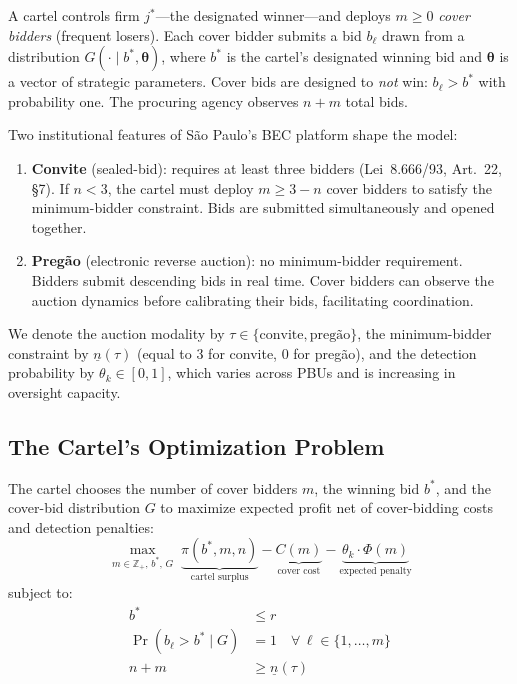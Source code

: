 A cartel controls firm $j^*$---the designated winner---and deploys
$m \geq 0$ \emph{cover bidders} (frequent losers). Each cover bidder
submits a bid $b_\ell$ drawn from a distribution $G(\cdot \mid b^*,
\boldsymbol{\theta})$, where $b^*$ is the cartel's designated winning
bid and $\boldsymbol{\theta}$ is a vector of strategic parameters. Cover
bids are designed to \emph{not} win: $b_\ell > b^*$ with probability
one. The procuring agency observes $n + m$ total bids.

Two institutional features of S\~ao Paulo's BEC platform shape the
model:

\begin{enumerate}
  \item \textbf{Convite} (sealed-bid): requires at least three bidders
    (Lei~8.666/93, Art.~22, \S7). If $n < 3$, the cartel must deploy
    $m \geq 3 - n$ cover bidders to satisfy the minimum-bidder
    constraint. Bids are submitted simultaneously and opened together.
  \item \textbf{Preg\~ao} (electronic reverse auction): no
    minimum-bidder requirement. Bidders submit descending bids in real
    time. Cover bidders can observe the auction dynamics before
    calibrating their bids, facilitating coordination.
\end{enumerate}

\noindent We denote the auction modality by $\tau \in \{\text{convite},
\text{preg\~ao}\}$, the minimum-bidder constraint by $\underline{n}(\tau)$
(equal to 3 for convite, 0 for preg\~ao), and the detection probability
by $\theta_k \in [0,1]$, which varies across PBUs and is increasing in
oversight capacity.


\subsection{The Cartel's Optimization Problem}
\label{sec:cartel_problem}

The cartel chooses the number of cover bidders $m$, the winning bid
$b^*$, and the cover-bid distribution $G$ to maximize expected profit
net of cover-bidding costs and detection penalties:
\begin{equation}
  \max_{m \in \mathbb{Z}_+,\, b^*,\, G} \; \underbrace{\pi(b^*, m, n)
  }_{\text{cartel surplus}}
  - \underbrace{C(m)}_{\text{cover cost}}
  - \underbrace{\theta_k \cdot \Phi(m)}_{\text{expected penalty}}
  \label{eq:cartel_objective}
\end{equation}
subject to:
\begin{align}
  b^* &\leq r \label{eq:ref_price_constraint} \\
  \Pr(b_\ell > b^* \mid G) &= 1 \quad \forall \, \ell \in \{1, \ldots, m\}
    \label{eq:cover_above} \\
  n + m &\geq \underline{n}(\tau) \label{eq:min_bidder}
\end{align}

